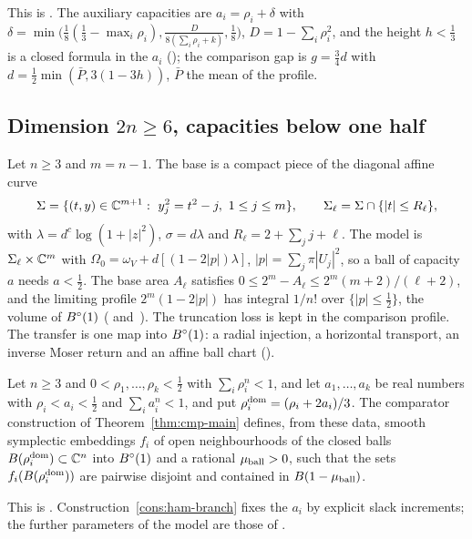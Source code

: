 This is . The auxiliary capacities are
$a_i=\rho_i+\delta$ with $\delta=\min\bigl(\frac18(\frac13-\max_i\rho_i),\frac{D}{8(\sum_i\rho_i+k)},\frac18\bigr)$,
$D=1-\sum_i\rho_i^2$, and the height $h<\frac13$ is a closed formula in the $a_i$ (); the
comparison gap is $g=\frac34d$ with $d=\frac12\min(\bar P,3(1-3h))$, $\bar P$ the mean of the profile.

\subsection{Dimension $2n\ge6$, capacities below one half}\label{sec:mdl-small}

Let $n\ge3$ and $m=n-1$. The base is a compact piece of the diagonal affine curve
\[
 \Sigma=\{(t,y)\in\mathbb{C}^{m+1}:\ y_j^2=t^2-j,\ 1\le j\le m\},\qquad \Sigma_\ell=\Sigma\cap\{|t|\le R_\ell\},
\]
with $\lambda=d^c\log(1+|z|^2)$, $\sigma=d\lambda$ and $R_\ell=2+\sum_jj+\ell$. The model is
$\Sigma_\ell\times\mathbb{C}^m$ with $\Omega_0=\omega_V+d[(1-2|p|)\lambda]$, $|p|=\sum_j\pi|U_j|^2$, so a ball of capacity
$a$ needs $a<\frac12$. The base area $A_\ell$ satisfies $0\le2^m-A_\ell\le2^m(m+2)/(\ell+2)$, and the limiting
profile $2^m(1-2|p|)$ has integral $1/n!$ over $\{|p|\le\frac12\}$, the volume of $B^{\circ}(1)$
( and~). The truncation loss is kept in the comparison profile.
The transfer is one map into $B^{\circ}(1)$: a radial injection, a horizontal transport, an inverse Moser return and an
affine ball chart ().

\begin{theorem}\label{thm:mdl-qdr}
Let $n\ge3$ and $0<\rho_1,\dots,\rho_k<\frac12$ with $\sum_i\rho_i^n<1$, and let $a_1,\dots,a_k$ be real numbers with
$\rho_i<a_i<\frac12$ and $\sum_ia_i^n<1$, and put $\rho_i^{\rm dom}=(\rho_i+2a_i)/3$. The comparator construction of
Theorem~\ref{thm:cmp-main} defines, from these data, smooth symplectic embeddings $f_i$ of open neighbourhoods of the
closed balls $B(\rho_i^{\rm dom})\subset\mathbb{C}^n$ into $B^{\circ}(1)$ and a rational $\mu_{\rm ball}>0$, such that the sets
$f_i(B(\rho_i^{\rm dom}))$ are pairwise disjoint and contained in $B(1-\mu_{\rm ball})$.
\end{theorem}

This is . Construction~\ref{cons:ham-branch} fixes the $a_i$ by explicit
slack increments; the further parameters of the model are those of .

